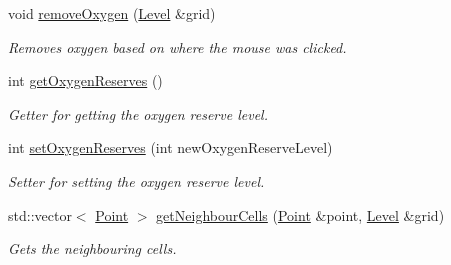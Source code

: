 \begin{DoxyCompactItemize}
\mbox{\label{class_oxygen_ae3c28e2013618899a992576620be4621}} 
void \hyperlink{class_oxygen_ae3c28e2013618899a992576620be4621}{remove\+Oxygen} (\hyperlink{class_level}{Level} \&grid)
\begin{DoxyCompactList}\small\item\em Removes oxygen based on where the mouse was clicked. \end{DoxyCompactList}\item 
\mbox{\label{class_oxygen_a178833a45a5ce351a8eb5f13b3f9807c}} 
int \hyperlink{class_oxygen_a178833a45a5ce351a8eb5f13b3f9807c}{get\+Oxygen\+Reserves} ()
\begin{DoxyCompactList}\small\item\em Getter for getting the oxygen reserve level. \end{DoxyCompactList}\item 
\mbox{\label{class_oxygen_a2e224ac6b5700c28018c1250c4a13fd5}} 
int \hyperlink{class_oxygen_a2e224ac6b5700c28018c1250c4a13fd5}{set\+Oxygen\+Reserves} (int new\+Oxygen\+Reserve\+Level)
\begin{DoxyCompactList}\small\item\em Setter for setting the oxygen reserve level. \end{DoxyCompactList}\item 
\mbox{\label{class_oxygen_a54f5ad1a9069339457cbb2a696f9951b}} 
std\+::vector$<$ \hyperlink{class_point}{Point} $>$ \hyperlink{class_oxygen_a54f5ad1a9069339457cbb2a696f9951b}{get\+Neighbour\+Cells} (\hyperlink{class_point}{Point} \&point, \hyperlink{class_level}{Level} \&grid)
\begin{DoxyCompactList}\small\item\em Gets the neighbouring cells. \end{DoxyCompactList}\end{DoxyCompactItemize}
